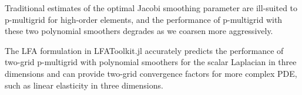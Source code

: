 \documentclass[review]{siamart190516}
\begin{document}
Traditional estimates of the optimal Jacobi smoothing parameter are ill-suited to p-multigrid for high-order elements, and the performance of p-multigrid with these two polynomial smoothers degrades as we coarsen more aggressively.

The LFA formulation in LFAToolkit.jl accurately predicts the performance of two-grid p-multigrid with polynomial smoothers for the scalar Laplacian in three dimensions and can provide two-grid convergence factors for more complex PDE, such as linear elasticity in three dimensions.



\end{document}
